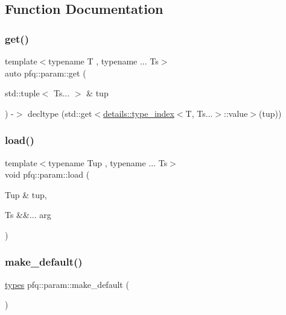 \subsection{Function Documentation}
\mbox{\label{namespacepfq_1_1param_a26825d94a20bcf1cc8353307ea00f5b7}} 
\subsubsection{\texorpdfstring{get()}{get()}}
{\footnotesize\ttfamily template$<$typename T , typename ... Ts$>$ \\
auto pfq\+::param\+::get (\begin{DoxyParamCaption}\item[{std\+::tuple$<$ Ts... $>$ \&}]{tup }\end{DoxyParamCaption}) -\/$>$ decltype (std\+::get$<$\hyperlink{structpfq_1_1param_1_1details_1_1type__index}{details\+::type\+\_\+index}$<$T, Ts...$>$\+::value$>$(tup))
        }

\mbox{\label{namespacepfq_1_1param_a471f17aaae9cec51e821654d80d825cd}} 
\subsubsection{\texorpdfstring{load()}{load()}}
{\footnotesize\ttfamily template$<$typename Tup , typename ... Ts$>$ \\
void pfq\+::param\+::load (\begin{DoxyParamCaption}\item[{Tup \&}]{tup,  }\item[{Ts \&\&...}]{arg }\end{DoxyParamCaption})}

\mbox{\label{namespacepfq_1_1param_af1fd1aeb980688527db587b35f55abf2}} 
\subsubsection{\texorpdfstring{make\+\_\+default()}{make\_default()}}
{\footnotesize\ttfamily \hyperlink{namespacepfq_1_1param_a287394f9fea16ebb76e770334aedd2d5}{types} pfq\+::param\+::make\+\_\+default (\begin{DoxyParamCaption}{ }\end{DoxyParamCaption})\hspace{0.3cm}{\ttfamily [inline]}}

